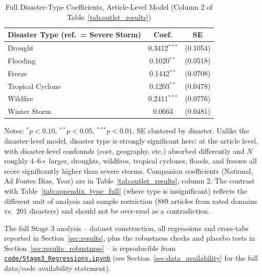 \documentclass[12pt]{article}
\begin{document}
\begin{table}[ht]
\centering
\caption{Full Disaster-Type Coefficients, Article-Level Model (Column 2 of Table~\ref{tab:outlet_results})}
\label{tab:appendix_article_full}
\begin{threeparttable}
\begin{tabular}{lcc}
\toprule
Disaster Type (ref.\ = Severe Storm) & Coef. & SE \\
\midrule
Drought          & 0.3412$^{***}$ & (0.1054) \\
Flooding         & 0.1020$^{**}$  & (0.0518) \\
Freeze           & 0.1442$^{**}$  & (0.0708) \\
Tropical Cyclone & 0.1203$^{**}$  & (0.0478) \\
Wildfire         & 0.2411$^{***}$ & (0.0776) \\
Winter Storm     & 0.0663         & (0.0481) \\
\bottomrule
\end{tabular}
\begin{tablenotes}
\small
\item Notes: $^{*}p<0.10$, $^{**}p<0.05$, $^{***}p<0.01$. SE clustered by
disaster. Unlike the disaster-level model, disaster type is strongly
significant here: at the article level, with disaster-level confounds
(cost, geography, etc.) absorbed differently and $N$ roughly 4--6$\times$
larger, droughts, wildfires, tropical cyclones, floods, and freezes all
score significantly higher than severe storms. Companion coefficients
(National, Ad Fontes Bias, Year) are in Table~\ref{tab:outlet_results},
column 2. The contrast with Table~\ref{tab:appendix_type_full} (where type
is insignificant) reflects the different unit of analysis and sample
restriction (889 articles from rated domains vs.\ 201 disasters) and
should not be over-read as a contradiction.
\end{tablenotes}
\end{threeparttable}
\end{table}

The full Stage 3 analysis -- dataset construction, all regressions and
cross-tabs reported in Section~\ref{sec:results}, plus the robustness
checks and placebo tests in Section~\ref{sec:results_robustness} -- is
reproducible from
\href{https://github.com/Hariaksha/reading-the-storm/blob/main/code/Stage3_Regressions.ipynb}{\texttt{code/Stage3\_Regressions.ipynb}}
(see Section~\ref{sec:data_availability} for the full data/code
availability statement).
\end{document}

